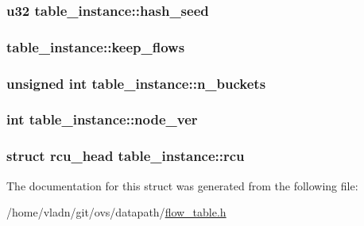\subsubsection[{hash\+\_\+seed}]{\setlength{\rightskip}{0pt plus 5cm}u32 table\+\_\+instance\+::hash\+\_\+seed}\label{structtable__instance_ad73f318c365fd86dda23e7ffb65d59b9}
\hypertarget{structtable__instance_af7a3a9cce56cbf7ed225ac0ec3ce9eb2}{}
\subsubsection[{keep\+\_\+flows}]{ table\+\_\+instance\+::keep\+\_\+flows}\label{structtable__instance_af7a3a9cce56cbf7ed225ac0ec3ce9eb2}
\hypertarget{structtable__instance_ae4f915a0e1b19ca677ae00c7eb5a3cb9}{}
\subsubsection[{n\+\_\+buckets}]{\setlength{\rightskip}{0pt plus 5cm}unsigned int table\+\_\+instance\+::n\+\_\+buckets}\label{structtable__instance_ae4f915a0e1b19ca677ae00c7eb5a3cb9}
\hypertarget{structtable__instance_ab992e9218f85e3b5193ae47e8fbf3f32}{}
\subsubsection[{node\+\_\+ver}]{\setlength{\rightskip}{0pt plus 5cm}int table\+\_\+instance\+::node\+\_\+ver}\label{structtable__instance_ab992e9218f85e3b5193ae47e8fbf3f32}
\hypertarget{structtable__instance_acf4d72ccfb947d0d0d08732a56664978}{}
\subsubsection[{rcu}]{\setlength{\rightskip}{0pt plus 5cm}struct rcu\+\_\+head table\+\_\+instance\+::rcu}\label{structtable__instance_acf4d72ccfb947d0d0d08732a56664978}


The documentation for this struct was generated from the following file\+:\begin{DoxyCompactItemize}
\item 
/home/vladn/git/ovs/datapath/\hyperlink{flow__table_8h}{flow\+\_\+table.\+h}\end{DoxyCompactItemize}
